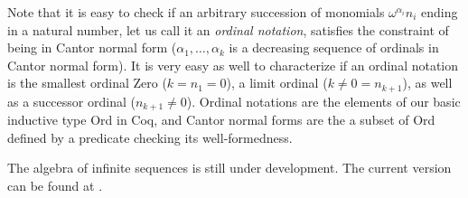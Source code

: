\documentclass{llncs}
\begin{document}
Note that it is easy to check if an arbitrary succession of monomials
$\omega^{\alpha_i}n_i$
ending in a natural number, let us call it an \emph{ordinal notation},
satisfies the constraint of being in Cantor normal form ($\alpha_1,
\ldots, \alpha_k$ is a decreasing sequence of ordinals in Cantor
normal form).  It is very easy as well to characterize if an ordinal
notation is the smallest ordinal Zero ($k=n_{1}=0$), a limit ordinal
($k\neq 0=n_{k+1}$), as well as a successor ordinal ($n_{k+1}\neq
0$). Ordinal notations are the elements of our basic inductive
type Ord in Coq, and Cantor normal forms are the a subset of Ord defined by
a predicate checking its well-formedness.

The algebra of infinite sequences is still under development. The
current version can be found at \url{}.
\end{document}

